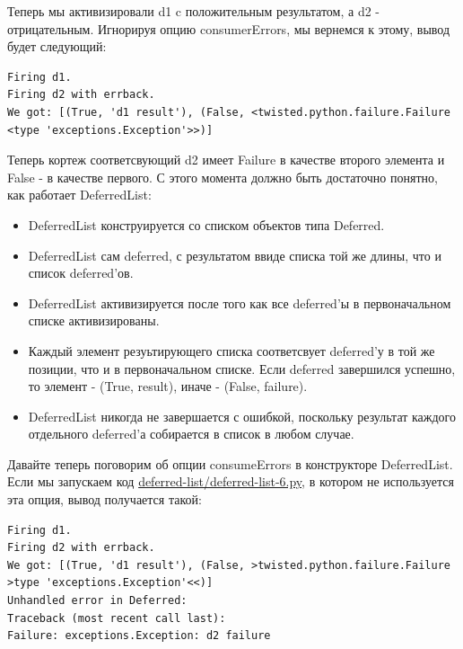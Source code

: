 Теперь мы активизировали d1 c положительным результатом, а 
d2 - отрицательным. Игнорируя опцию consumerErrors, 
мы вернемся к этому, вывод будет следующий:

\begin{scriptsize}\begin{verbatim}
Firing d1.
Firing d2 with errback.
We got: [(True, 'd1 result'), (False, <twisted.python.failure.Failure <type 'exceptions.Exception'>>)]
\end{verbatim}\end{scriptsize}

Теперь кортеж соответсвующий d2 имеет Failure в качестве второго элемента и 
False - в качестве первого. С этого момента должно быть достаточно понятно, как 
работает DeferredList:

\begin{itemize}

\item DeferredList конструируется со списком объектов типа Deferred.

\item DeferredList сам deferred, с результатом ввиде списка той же длины, что и список deferred'ов.

\item DeferredList активизируется после того как все deferred'ы в первоначальном 
    списке активизированы.

\item Каждый элемент резуьтирующего списка соответсвует 
    deferred'у в той же позиции, что и в первоначальном списке. Если 
    deferred завершился успешно, то элемент - (True, result), 
    иначе - (False, failure).

\item DeferredList никогда не завершается с ошибкой, поскольку 
    результат каждого отдельного deferred'а собирается в список 
    в любом случае.
\end{itemize}


Давайте теперь поговорим об опции consumeErrors в 
конструкторе DeferredList. Если мы запускаем код 
\href{http://github.com/jdavisp3/twisted-intro/blob/master/deferred-list/deferred-list-6.py#L1}{deferred-list/deferred-list-6.py}, в котором не используется эта опция, вывод получается такой:


\begin{scriptsize}\begin{verbatim}
Firing d1.
Firing d2 with errback.
We got: [(True, 'd1 result'), (False, >twisted.python.failure.Failure >type 'exceptions.Exception'<<)]
Unhandled error in Deferred:
Traceback (most recent call last):
Failure: exceptions.Exception: d2 failure
\end{verbatim}\end{scriptsize}



